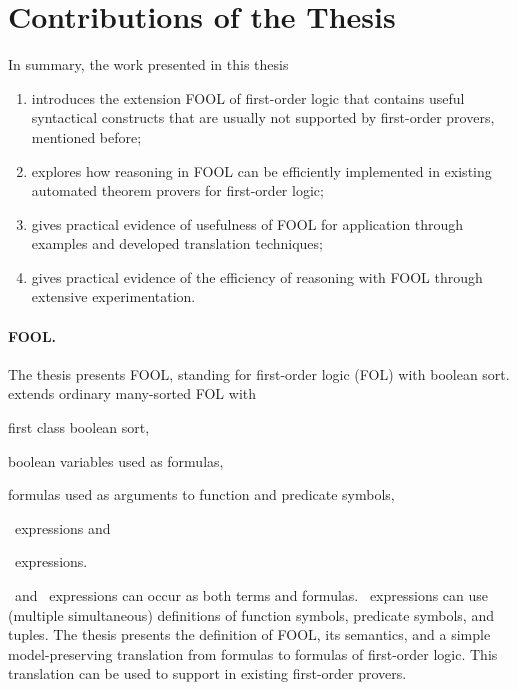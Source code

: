 \section*{Contributions of the Thesis}
\label{sect:intro:contributions}

In summary, the work presented in this thesis
\begin{enumerate}
  \item introduces the extension FOOL of first-order logic that contains useful syntactical constructs that are usually not supported by first-order provers, mentioned before;
  \item explores how reasoning in FOOL can be efficiently implemented in existing automated theorem provers for first-order logic;
  \item gives practical evidence of usefulness of FOOL for application through examples and developed translation techniques;
  \item gives practical evidence of the efficiency of reasoning with FOOL through extensive experimentation.
\end{enumerate}

\paragraph{FOOL.}
The thesis presents FOOL, standing for first-order logic (FOL) with boolean sort. \folb{} extends ordinary many-sorted FOL with \begin{enumerate*}[label=(\roman*)]\item first class boolean sort, \item boolean variables used as formulas, \item formulas used as arguments to function and predicate symbols, \item \ITE\ expressions and \item \LETIN\ expressions.\end{enumerate*} \ITE\ and \LETIN\ expressions can occur as both terms and formulas. \LETIN\ expressions can use (multiple simultaneous) definitions of function symbols, predicate symbols, and tuples. The thesis presents the definition of FOOL, its semantics, and a simple model-preserving translation from \folb{} formulas to formulas of first-order logic. This translation can be used to support \folb{} in existing first-order provers.

